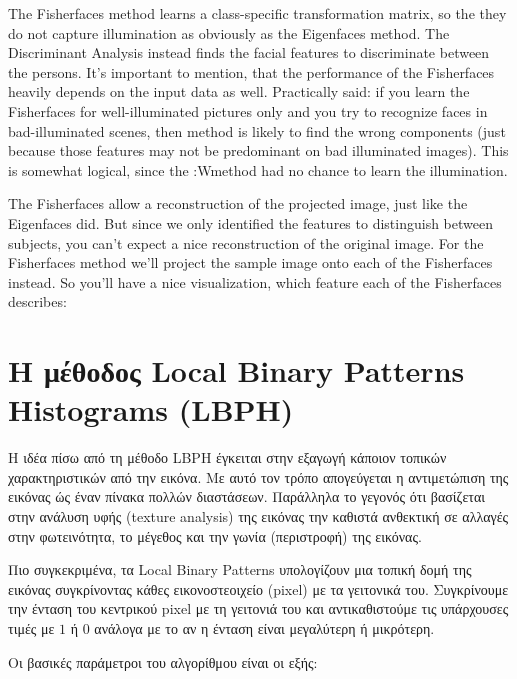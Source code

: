  The Fisherfaces method learns a class-specific transformation matrix, so the they do not capture illumination as obviously as the Eigenfaces method. The Discriminant Analysis instead finds the facial features to discriminate between the persons. It's important to mention, that the performance of the Fisherfaces heavily depends on the input data as well. Practically said: if you learn the Fisherfaces for well-illuminated pictures only and you try to recognize faces in bad-illuminated scenes, then method is likely to find the wrong components (just because those features may not be predominant on bad illuminated images). This is somewhat logical, since the :Wmethod had no chance to learn the illumination.

 The Fisherfaces allow a reconstruction of the projected image, just like the Eigenfaces did. But since we only identified the features to distinguish between subjects, you can't expect a nice reconstruction of the original image. For the Fisherfaces method we'll project the sample image onto each of the Fisherfaces instead. So you'll have a nice visualization, which feature each of the Fisherfaces describes:


\section{H μέθοδος Local Binary Patterns Histograms (LBPH)}\label{sec:lbph}

Η ιδέα πίσω από τη μέθοδο LBPH έγκειται στην εξαγωγή κάποιον τοπικών χαρακτηριστικών
από την εικόνα. Με αυτό τον τρόπο απογεύγεται η αντιμετώπιση της εικόνας ώς έναν πίνακα πολλών
διαστάσεων. Παράλληλα το γεγονός ότι βασίζεται στην ανάλυση υφής (texture analysis)
της εικόνας την καθιστά ανθεκτική σε αλλαγές στην φωτεινότητα, το μέγεθος και την
γωνία (περιστροφή) της εικόνας.

Πιο συγκεκριμένα, τα Local Binary Patterns υπολογίζουν μια τοπική δομή της εικόνας
συγκρίνοντας κάθες εικονοστεοιχείο (pixel) με τα γειτονικά του. Συγκρίνουμε την ένταση
του κεντρικού pixel με τη γειτονιά του και αντικαθιστούμε τις υπάρχουσες τιμές με
$1$ ή $0$ ανάλογα με το αν η ένταση είναι μεγαλύτερη ή μικρότερη.

Οι βασικές παράμετροι του αλγορίθμου είναι οι εξής:

